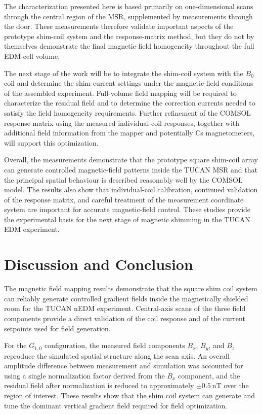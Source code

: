 \documentclass[preprint,12pt]{elsarticle}
\begin{document}
The characterization presented here is based primarily on
one-dimensional scans through the central region of the MSR,
supplemented by measurements through the door. These measurements
therefore validate important aspects of the prototype shim-coil system
and the response-matrix method, but they do not by themselves
demonstrate the final magnetic-field homogeneity throughout the full
EDM-cell volume.

The next stage of the work will be to integrate the shim-coil system
with the $B_0$ coil and determine the shim-current settings under the
magnetic-field conditions of the assembled experiment. Full-volume
field mapping will be required to characterize the residual field and
to determine the correction currents needed to satisfy the field
homogeneity requirements. Further refinement of the COMSOL response
matrix using the measured individual-coil responses, together with
additional field information from the mapper and potentially Cs
magnetometers, will support this optimization.

Overall, the measurements demonstrate that the prototype square
shim-coil array can generate controlled magnetic-field patterns inside
the TUCAN MSR and that the principal spatial behaviour is described
reasonably well by the COMSOL model. The results also show that
individual-coil calibration, continued validation of the response
matrix, and careful treatment of the measurement coordinate system are
important for accurate magnetic-field control. These studies provide
the experimental basis for the next stage of magnetic shimming in the
TUCAN EDM experiment.




\section{Discussion and Conclusion}\label{sec8}

The magnetic field mapping results demonstrate that the square shim coil system can reliably generate controlled gradient fields inside the magnetically shielded room for the TUCAN nEDM experiment. Central-axis scans of the three field components provide a direct validation of the coil response and of the current setpoints used for field generation.

For the $G_{1,0}$ configuration, the measured field components $B_x$, $B_y$, and $B_z$ reproduce the simulated spatial structure along the scan axis. An overall amplitude difference between measurement and simulation was accounted for using a single normalization factor derived from the $B_x$ component, and the residual field after normalization is reduced to approximately $\pm 0.5~\mathrm{nT}$ over the region of interest. These results show that the shim coil system can generate and tune the dominant vertical gradient field required for field optimization.
\end{document}
